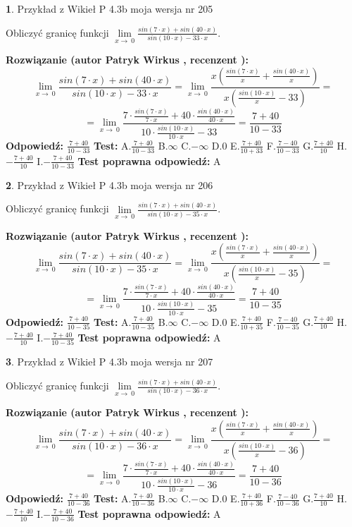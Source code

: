 \documentclass[12pt, a4paper]{article}
\theoremstyle{definition} %
\newtheorem{zad}{}
\newcommand{\zadStart}[1]{\begin{zad}#1\newline}
\newcommand{\zadStop}{\end{zad}}
\newcommand{\rozwStart}[2]{\noindent \textbf{Rozwiązanie (autor #1 , recenzent #2): }\newline}
\newcommand{\rozwStop}{\newline}
\newcommand{\odpStart}{\noindent \textbf{Odpowiedź:}\newline}
\newcommand{\odpStop}{\newline}
\newcommand{\testStart}{\noindent \textbf{Test:}\newline}
\newcommand{\testStop}{\newline}
\newcommand{\kluczStart}{\noindent \textbf{Test poprawna odpowiedź:}\newline}
\newcommand{\kluczStop}{\newline}
\begin{document}
\zadStart{Przykład z Wikieł P 4.3b moja wersja nr 205}


Obliczyć granicę funkcji $\lim\limits_{x\to\ 0}\frac{sin(7 \cdot x)+sin(40 \cdot x)}{sin(10 \cdot x)-33 \cdot x}$.
\zadStop
\rozwStart{Patryk Wirkus}{}
$$\lim\limits_{x\to\ 0}\frac{sin(7 \cdot x)+sin(40 \cdot x)}{sin(10 \cdot x)-33 \cdot x}=\lim\limits_{x\to\ 0}\frac{x(\frac{sin(7 \cdot x)}{x}+\frac{sin(40 \cdot x)}{x})}{x(\frac{sin(10 \cdot x)}{x}-33)}=$$
$$=\lim\limits_{x\to\ 0}\frac{7 \cdot \frac{sin(7 \cdot x)}{7 \cdot x}+40 \cdot \frac{sin(40 \cdot x)}{40 \cdot x}}{10 \cdot \frac{sin(10 \cdot x)}{10 \cdot x}-33}=\frac{7+40}{10-33}$$
\rozwStop
\odpStart
$\frac{7+40}{10-33}$
\odpStop
\testStart
A.$\frac{7+40}{10-33}$
B.$\infty$
C.$-\infty$
D.$0$
E.$\frac{7+40}{10+33}$
F.$\frac{7-40}{10-33}$
G.$\frac{7+40}{10}$
H.$-\frac{7+40}{10}$
I.$-\frac{7+40}{10-33}$
\testStop
\kluczStart
A
\kluczStop



\zadStart{Przykład z Wikieł P 4.3b moja wersja nr 206}


Obliczyć granicę funkcji $\lim\limits_{x\to\ 0}\frac{sin(7 \cdot x)+sin(40 \cdot x)}{sin(10 \cdot x)-35 \cdot x}$.
\zadStop
\rozwStart{Patryk Wirkus}{}
$$\lim\limits_{x\to\ 0}\frac{sin(7 \cdot x)+sin(40 \cdot x)}{sin(10 \cdot x)-35 \cdot x}=\lim\limits_{x\to\ 0}\frac{x(\frac{sin(7 \cdot x)}{x}+\frac{sin(40 \cdot x)}{x})}{x(\frac{sin(10 \cdot x)}{x}-35)}=$$
$$=\lim\limits_{x\to\ 0}\frac{7 \cdot \frac{sin(7 \cdot x)}{7 \cdot x}+40 \cdot \frac{sin(40 \cdot x)}{40 \cdot x}}{10 \cdot \frac{sin(10 \cdot x)}{10 \cdot x}-35}=\frac{7+40}{10-35}$$
\rozwStop
\odpStart
$\frac{7+40}{10-35}$
\odpStop
\testStart
A.$\frac{7+40}{10-35}$
B.$\infty$
C.$-\infty$
D.$0$
E.$\frac{7+40}{10+35}$
F.$\frac{7-40}{10-35}$
G.$\frac{7+40}{10}$
H.$-\frac{7+40}{10}$
I.$-\frac{7+40}{10-35}$
\testStop
\kluczStart
A
\kluczStop



\zadStart{Przykład z Wikieł P 4.3b moja wersja nr 207}


Obliczyć granicę funkcji $\lim\limits_{x\to\ 0}\frac{sin(7 \cdot x)+sin(40 \cdot x)}{sin(10 \cdot x)-36 \cdot x}$.
\zadStop
\rozwStart{Patryk Wirkus}{}
$$\lim\limits_{x\to\ 0}\frac{sin(7 \cdot x)+sin(40 \cdot x)}{sin(10 \cdot x)-36 \cdot x}=\lim\limits_{x\to\ 0}\frac{x(\frac{sin(7 \cdot x)}{x}+\frac{sin(40 \cdot x)}{x})}{x(\frac{sin(10 \cdot x)}{x}-36)}=$$
$$=\lim\limits_{x\to\ 0}\frac{7 \cdot \frac{sin(7 \cdot x)}{7 \cdot x}+40 \cdot \frac{sin(40 \cdot x)}{40 \cdot x}}{10 \cdot \frac{sin(10 \cdot x)}{10 \cdot x}-36}=\frac{7+40}{10-36}$$
\rozwStop
\odpStart
$\frac{7+40}{10-36}$
\odpStop
\testStart
A.$\frac{7+40}{10-36}$
B.$\infty$
C.$-\infty$
D.$0$
E.$\frac{7+40}{10+36}$
F.$\frac{7-40}{10-36}$
G.$\frac{7+40}{10}$
H.$-\frac{7+40}{10}$
I.$-\frac{7+40}{10-36}$
\testStop
\kluczStart
A
\kluczStop
\end{document}
